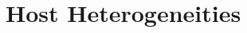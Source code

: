 \documentclass[a4paper,10pt,twoside]{book}
\begin{document}
\fi
\sloppy

\chapter{ Host Heterogeneities}\label{ Host Heterogeneities}


\ifx\wholebook\relax\else
   
\end{document}
